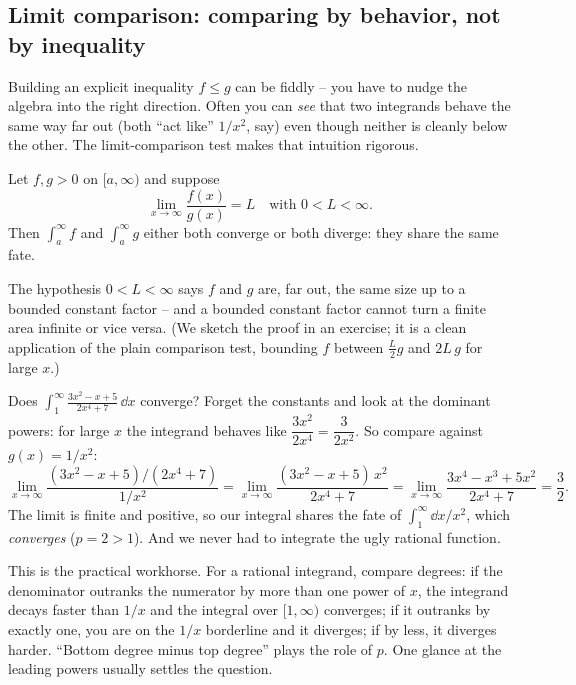 \subsection{Limit comparison: comparing by behavior, not by inequality}
\label{ch25:limit-comparison}

Building an explicit inequality $f \le g$ can be fiddly -- you have to nudge the
algebra into the right direction. Often you can \emph{see} that two integrands
behave the same way far out (both ``act like'' $1/x^2$, say) even though neither is
cleanly below the other. The limit-comparison test makes that intuition rigorous.

\begin{theorem}
\label{ch25:thm-limit-comparison}
Let $f, g > 0$ on $[a,\infty)$ and suppose
\[
  \lim_{x\to\infty}\frac{f(x)}{g(x)} = L
  \quad\text{with } 0 < L < \infty.
\]
Then $\int_a^\infty f$ and $\int_a^\infty g$ either both converge or both diverge:
they share the same fate.
\end{theorem}

The hypothesis $0 < L < \infty$ says $f$ and $g$ are, far out, the same size up to
a bounded constant factor -- and a bounded constant factor cannot turn a finite
area infinite or vice versa. (We sketch the proof in an exercise; it is a clean
application of the plain comparison test, bounding $f$ between $\frac{L}{2}g$ and
$2L\,g$ for large $x$.)

\begin{example}
\label{ch25:ex-limcomp}
Does $\displaystyle\int_1^{\infty}\frac{3x^2 - x + 5}{2x^4 + 7}\,\dd x$ converge?
Forget the constants and look at the dominant powers: for large $x$ the integrand
behaves like $\dfrac{3x^2}{2x^4} = \dfrac{3}{2x^2}$. So compare against
$g(x) = 1/x^2$:
\[
  \lim_{x\to\infty}\frac{(3x^2-x+5)/(2x^4+7)}{1/x^2}
  = \lim_{x\to\infty}\frac{(3x^2-x+5)\,x^2}{2x^4+7}
  = \lim_{x\to\infty}\frac{3x^4 - x^3 + 5x^2}{2x^4 + 7}
  = \frac{3}{2}.
\]
The limit is finite and positive, so our integral shares the fate of
$\int_1^\infty \dd x/x^2$, which \emph{converges} ($p=2 > 1$). And we never had to
integrate the ugly rational function.
\end{example}

\begin{focusbox}
This is the practical workhorse. For a rational integrand, compare degrees: if the
denominator outranks the numerator by more than one power of $x$, the integrand
decays faster than $1/x$ and the integral over $[1,\infty)$ converges; if it
outranks by exactly one, you are on the $1/x$ borderline and it diverges; if by
less, it diverges harder. ``Bottom degree minus top degree'' plays the role of
$p$. One glance at the leading powers usually settles the question.
\end{focusbox}


